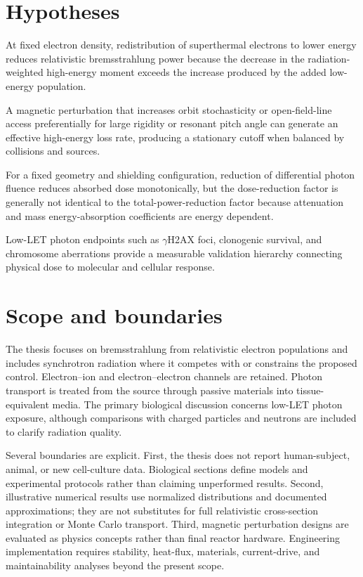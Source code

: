 \section{Hypotheses}

\begin{description}[leftmargin=1.6cm,style=nextline]
\item[H1.] At fixed electron density, redistribution of superthermal electrons to lower energy reduces relativistic bremsstrahlung power because the decrease in the radiation-weighted high-energy moment exceeds the increase produced by the added low-energy population.
\item[H2.] A magnetic perturbation that increases orbit stochasticity or open-field-line access preferentially for large rigidity or resonant pitch angle can generate an effective high-energy loss rate, producing a stationary cutoff when balanced by collisions and sources.
\item[H3.] For a fixed geometry and shielding configuration, reduction of differential photon fluence reduces absorbed dose monotonically, but the dose-reduction factor is generally not identical to the total-power-reduction factor because attenuation and mass energy-absorption coefficients are energy dependent.
\item[H4.] Low-LET photon endpoints such as $\gamma$H2AX foci, clonogenic survival, and chromosome aberrations provide a measurable validation hierarchy connecting physical dose to molecular and cellular response.
\end{description}

\section{Scope and boundaries}

The thesis focuses on bremsstrahlung from relativistic electron populations and includes synchrotron radiation where it competes with or constrains the proposed control. Electron--ion and electron--electron channels are retained. Photon transport is treated from the source through passive materials into tissue-equivalent media. The primary biological discussion concerns low-LET photon exposure, although comparisons with charged particles and neutrons are included to clarify radiation quality.

Several boundaries are explicit. First, the thesis does not report human-subject, animal, or new cell-culture data. Biological sections define models and experimental protocols rather than claiming unperformed results. Second, illustrative numerical results use normalized distributions and documented approximations; they are not substitutes for full relativistic cross-section integration or Monte Carlo transport. Third, magnetic perturbation designs are evaluated as physics concepts rather than final reactor hardware. Engineering implementation requires stability, heat-flux, materials, current-drive, and maintainability analyses beyond the present scope.

